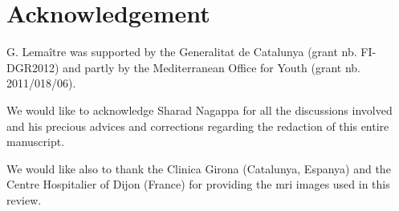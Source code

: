 \section{Acknowledgement} \label{sec:acknowledgement}

G. Lema\^itre was supported by the Generalitat de Catalunya (grant nb. FI-DGR2012) and partly by the Mediterranean Office for Youth (grant nb. 2011/018/06).

We would like to acknowledge Sharad Nagappa for all the discussions involved and his precious advices and corrections regarding the redaction of this entire manuscript.

We would like also to thank the Clinica Girona (Catalunya, Espanya) and the Centre Hospitalier of Dijon (France) for providing the \ac{mri} images used in this review.
